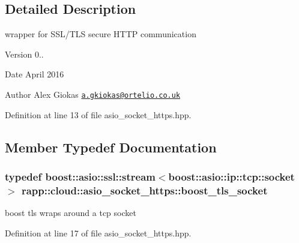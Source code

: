 \subsection{Detailed Description}
wrapper for S\-S\-L/\-T\-L\-S secure H\-T\-T\-P communication 

\begin{DoxyVersion}{Version}
0.. 
\end{DoxyVersion}
\begin{DoxyDate}{Date}
April 2016 
\end{DoxyDate}
\begin{DoxyAuthor}{Author}
Alex Giokas \href{mailto:a.gkiokas@ortelio.co.uk}{\tt a.\-gkiokas@ortelio.\-co.\-uk} 
\end{DoxyAuthor}


Definition at line 13 of file asio\-\_\-socket\-\_\-https.\-hpp.



\subsection{Member Typedef Documentation}
\hypertarget{classrapp_1_1cloud_1_1asio__socket__https_a5c1860ee9dbd4b6b0a2e814c5c094b4e}{
\subsubsection[{boost\-\_\-tls\-\_\-socket}]{\setlength{\rightskip}{0pt plus 5cm}typedef boost\-::asio\-::ssl\-::stream$<$boost\-::asio\-::ip\-::tcp\-::socket$>$ {\bf rapp\-::cloud\-::asio\-\_\-socket\-\_\-https\-::boost\-\_\-tls\-\_\-socket}}}\label{classrapp_1_1cloud_1_1asio__socket__https_a5c1860ee9dbd4b6b0a2e814c5c094b4e}


boost tls wraps around a tcp socket 



Definition at line 17 of file asio\-\_\-socket\-\_\-https.\-hpp.



